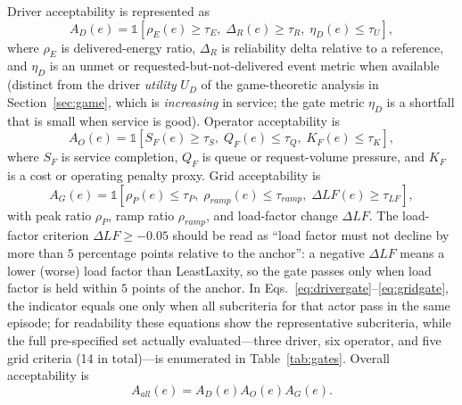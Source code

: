 \documentclass[12pt]{article}
\begin{document}
Driver acceptability is represented as
\begin{equation}
A_D(e)=\mathbb{1}\left[ \rho_E(e)\geq \tau_E,\; \Delta_R(e)\geq \tau_R,\; \eta_D(e)\leq \tau_U \right],
\label{eq:drivergate}
\end{equation}
where $\rho_E$ is delivered-energy ratio, $\Delta_R$ is reliability delta relative to a reference, and $\eta_D$ is an unmet or requested-but-not-delivered event metric when available (distinct from the driver \emph{utility} $U_D$ of the game-theoretic analysis in Section~\ref{sec:game}, which is \emph{increasing} in service; the gate metric $\eta_D$ is a shortfall that is small when service is good). Operator acceptability is
\begin{equation}
A_O(e)=\mathbb{1}\left[ S_F(e)\geq \tau_S,\; Q_F(e)\leq \tau_Q,\; K_F(e)\leq \tau_K \right],
\label{eq:fleetgate}
\end{equation}
where $S_F$ is service completion, $Q_F$ is queue or request-volume pressure, and $K_F$ is a cost or operating penalty proxy. Grid acceptability is
\begin{equation}
A_G(e)=\mathbb{1}\left[ \rho_P(e)\leq \tau_P,\; \rho_{ramp}(e)\leq \tau_{ramp},\; \Delta LF(e)\geq \tau_{LF} \right],
\label{eq:gridgate}
\end{equation}
with peak ratio $\rho_P$, ramp ratio $\rho_{ramp}$, and load-factor change $\Delta LF$. The load-factor criterion $\Delta LF \geq -0.05$ should be read as ``load factor must not decline by more than $5$ percentage points relative to the anchor'': a negative $\Delta LF$ means a lower (worse) load factor than LeastLaxity, so the gate passes only when load factor is held within $5$ points of the anchor. In Eqs.~\eqref{eq:drivergate}--\eqref{eq:gridgate}, the indicator equals one only when all subcriteria for that actor pass in the same episode; for readability these equations show the representative subcriteria, while the full pre-specified set actually evaluated---three driver, six operator, and five grid criteria (14 in total)---is enumerated in Table~\ref{tab:gates}. Overall acceptability is
\begin{equation}
A_{all}(e)=A_D(e)A_O(e)A_G(e).
\label{eq:allgate}
\end{equation}
\end{document}
